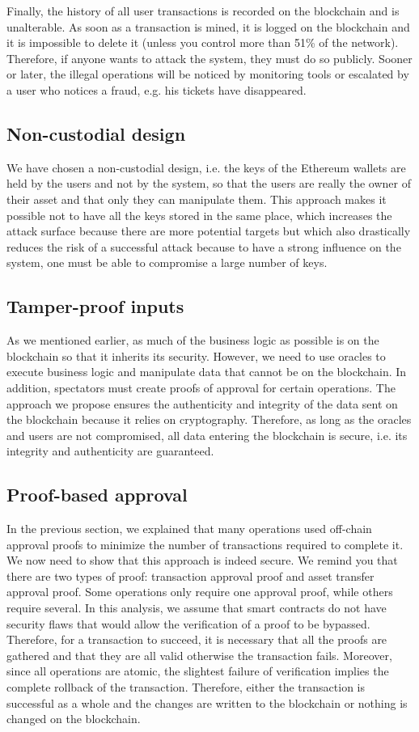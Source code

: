 \documentclass[a4paper,11pt,oneside]{report}
\begin{document}
Finally, the history of all user transactions is recorded on the blockchain and is unalterable. As soon as a transaction is mined, it is logged on the blockchain and it is impossible to delete it (unless you control more than 51\% of the network). Therefore, if anyone wants to attack the system, they must do so publicly. Sooner or later, the illegal operations will be noticed by monitoring tools or escalated by a user who notices a fraud, e.g. his tickets have disappeared.

\subsection{Non-custodial design}
We have chosen a non-custodial design, i.e. the keys of the Ethereum wallets are held by the users and not by the system, so that the users are really the owner of their asset and that only they can manipulate them. This approach makes it possible not to have all the keys stored in the same place, which increases the attack surface because there are more potential targets but which also drastically reduces the risk of a successful attack because to have a strong influence on the system, one must be able to compromise a large number of keys.

\subsection{Tamper-proof inputs}
As we mentioned earlier, as much of the business logic as possible is on the blockchain so that it inherits its security. However, we need to use oracles to execute business logic and manipulate data that cannot be on the blockchain. In addition, spectators must create proofs of approval for certain operations. The approach we propose ensures the authenticity and integrity of the data sent on the blockchain because it relies on cryptography. Therefore, as long as the oracles and users are not compromised, all data entering the blockchain is secure, i.e. its integrity and authenticity are guaranteed.

\subsection{Proof-based approval}
In the previous section, we explained that many operations used off-chain approval proofs to minimize the number of transactions required to complete it. We now need to show that this approach is indeed secure. We remind you that there are two types of proof: transaction approval proof and asset transfer approval proof. Some operations only require one approval proof, while others require several. In this analysis, we assume that smart contracts do not have security flaws that would allow the verification of a proof to be bypassed. Therefore, for a transaction to succeed, it is necessary that all the proofs are gathered and that they are all valid otherwise the transaction fails. Moreover, since all operations are atomic, the slightest failure of verification implies the complete rollback of the transaction. Therefore, either the transaction is successful as a whole and the changes are written to the blockchain or nothing is changed on the blockchain.
\end{document}
